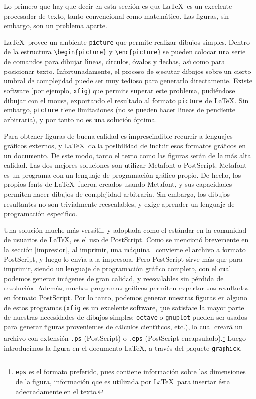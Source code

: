 {Lo primero que hay que decir en esta secci\'on es que \LaTeX\ es un
excelente procesador de texto, tanto convencional como
matem\'atico. Las figuras, sin embargo, son un problema
aparte. 

\LaTeX\ provee un ambiente \verb+picture+ que permite realizar dibujos
simples. Dentro de la estructura \verb+\begin{picture}+ y
  \verb+\end{picture}+ se pueden colocar una serie de comandos para
dibujar l{\'\i}neas, c{\'\i}rculos, {\'o}valos y flechas, as{\'\i} como para posicionar
texto.  Infortunadamente, el proceso de ejecutar dibujos sobre un
cierto umbral de complejidad puede ser muy tedioso para generarlo
directamente.  Existe software (por ejemplo, \verb+xfig+)
que permite superar este problema, pudi\'endose dibujar con el mouse,
exportando el resultado al formato \verb+picture+ de \LaTeX. Sin
embargo, \verb+picture+ tiene limitaciones (no se pueden hacer
l\'{\i}neas de pendiente arbitraria), y por tanto no es una soluci\'on
\'optima. 

Para obtener figuras de buena calidad es imprescindible recurrir a
lenguajes gr\'aficos externos, y \LaTeX\ da la posibilidad de incluir
esos formatos gr\'aficos en un documento. De este modo, tanto el texto
como las figuras ser\'an de la m\'as alta calidad. Las dos mejores
soluciones son utilizar Metafont o PostScript. Metafont es un programa
con un lenguaje de programaci\'on gr\'afico propio. De hecho, los
propios fonts de \LaTeX\ fueron creados usando Metafont, y sus
capacidades permiten hacer dibujos de complejidad arbitraria. Sin
embargo, los dibujos resultantes no son trivialmente reescalables, y
exige aprender un lenguaje de programaci\'on espec\'{\i}fico.

Una soluci\'on mucho m\'as vers\'atil, y adoptada como el est\'andar
en la comunidad de usuarios de \LaTeX, es el uso de PostScript. Como
se mencion\'o brevemente en la secci\'on \ref{impresion}, al
imprimir, una
m\'aquina \unix\ convierte el archivo a formato PostScript, y luego lo
env\'{\i}a a la impresora. Pero PostScript sirve m\'as que para
imprimir, siendo un lenguaje de programaci\'on gr\'afico completo, con
el cual podemos generar im\'agenes de gran calidad, y
reescalables sin p\'erdida de resoluci\'on. Adem\'as, muchos
programas gr\'aficos permiten exportar sus resultados en formato
PostScript. Por lo tanto, podemos generar nuestras figuras en alguno
de estos programas (\verb+xfig+ es un excelente software, que 
satisface la mayor parte de nuestras
necesidades de dibujos simples; \verb+octave+ o \verb+gnuplot+ pueden
ser usados para generar figuras provenientes de c\'alculos
cient\'{\i}ficos,  etc.), lo cual crear\'a un archivo con extensi\'on
\verb+.ps+ (PostScript) o \verb+.eps+ (PostScript 
encapsulado).\footnote{{\tt eps} es el formato preferido, pues
  contiene informaci\'on sobre las dimensiones de la figura,
  informaci\'on que es
  utilizada por \LaTeX\ para insertar \'esta adecuadamente en el texto.} Luego 
introducimos la figura en el documento \LaTeX, a trav\'es del paquete
\verb+graphicx+. 

}
